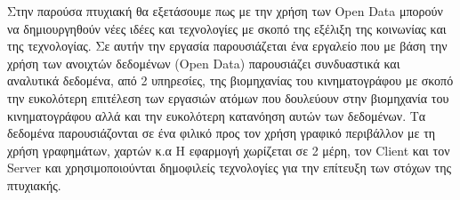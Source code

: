 \begin{Abstract}
Στην παρούσα πτυχιακή θα εξετάσουμε πως με την χρήση των Open Data μπορούν να δημιουργηθούν νέες ιδέες και τεχνολογίες με σκοπό της εξέλιξη της κοινωνίας και της τεχνολογίας. 
Σε αυτήν την εργασία παρουσιάζεται ένα εργαλείο που με βάση την χρήση των ανοιχτών δεδομένων (Open Data) παρουσιάζει συνδυαστικά και αναλυτικά δεδομένα, από 2 υπηρεσίες, της βιομηχανίας του κινηματογράφου με σκοπό την ευκολότερη επιτέλεση των εργασιών ατόμων που δουλεύουν στην βιομηχανία του κινηματογράφου αλλά και την ευκολότερη κατανόηση αυτών των δεδομένων. Τα δεδομένα παρουσιάζονται σε ένα φιλικό προς τον χρήση γραφικό περιβάλλον με τη χρήση γραφημάτων, χαρτών κ.α
Η εφαρμογή χωρίζεται σε 2 μέρη, τον Client και τον Server και χρησιμοποιούνται δημοφιλείς τεχνολογίες για την επίτευξη των στόχων της πτυχιακής.
\end{Abstract}